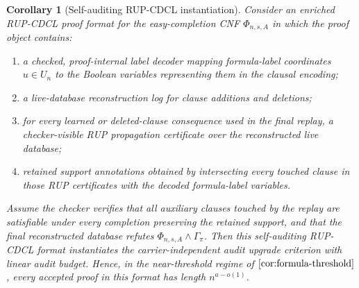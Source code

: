 \documentclass[11pt]{article}
\newtheorem{corollary}[theorem]{Corollary}
\theoremstyle{definition}
\begin{document}
\begin{corollary}[Self-auditing RUP-CDCL instantiation]\label{cor:self-auditing-rup-cdcl}
Consider an enriched RUP-CDCL proof format for the easy-completion CNF
\(\Phi_{n,s,A}\) in which the proof object contains:
\begin{enumerate}[label=(\roman*)]
  \item a checked, proof-internal label decoder mapping formula-label
  coordinates \(u\in U_n\) to the Boolean variables representing them in the
  clausal encoding;
  \item a live-database reconstruction log for clause additions and deletions;
  \item for every learned or deleted-clause consequence used in the final
  replay, a checker-visible RUP propagation certificate over the reconstructed
  live database;
  \item retained support annotations obtained by intersecting every touched
  clause in those RUP certificates with the decoded formula-label variables.
\end{enumerate}
Assume the checker verifies that all auxiliary clauses touched by the replay
are satisfiable under every completion preserving the retained support, and
that the final reconstructed database refutes
\(\Phi_{n,s,A}\wedge\Gamma_\pi\).  Then this self-auditing RUP-CDCL format
instantiates the carrier-independent audit upgrade criterion with linear audit
budget.  Hence, in the near-threshold regime of
\(\Cref{cor:formula-threshold}\), every accepted proof in this format has
length \(n^{a-o(1)}\).
\end{corollary}
\end{document}
